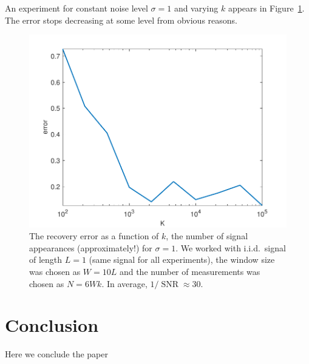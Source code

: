 \documentclass[journal]{IEEEtran}
\numberwithin{equation}{section}
\numberwithin{figure}{section}
\theoremstyle{plain}
\theoremstyle{definition}
\theoremstyle{remark}
\theoremstyle{plain}
\theoremstyle{remark}
\theoremstyle{plain}
\theoremstyle{plain}
\newcommand{\SNR}{\operatorname{SNR}}
\begin{document}
An experiment for constant noise level $\sigma=1$ and varying $k$ appears in Figure~\ref{fig:varyingK}. The error stops decreasing at some level from obvious reasons.


\begin{figure}
	\centering
	\includegraphics[scale=0.5]{errXP1.pdf}
	\caption{\label{fig:varyingK}The recovery error as a function of $k$, the number of signal appearances (approximately!) for $\sigma=1$. We worked with i.i.d.\ signal of length $L=1$ (same signal for all experiments), the window size was chosen as $W=10L$ and the number of measurements was chosen as $N =6Wk $. In average, $1/\SNR\approx 30$.}
\end{figure}



\section{Conclusion} \label{sec:conclusion}
Here we conclude the paper





\end{document}

